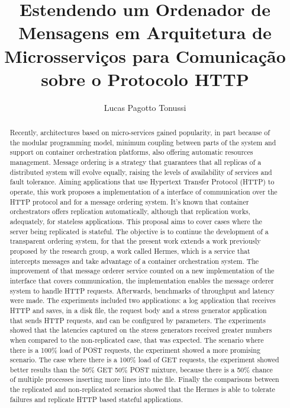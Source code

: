 \documentclass[12pt]{article}
\title{Estendendo um Ordenador de Mensagens em Arquitetura de Microsserviços para Comunicação sobre o Protocolo HTTP}
\author{Lucas Pagotto Tonussi\inst{1} }
\begin{document}
 

\maketitle

\begin{abstract}
Recently, architectures based on micro-services gained popularity, in part because of the modular programming model, minimum coupling between parts of the system and support on container orchestration platforms, also offering automatic resources management. Message ordering is a strategy that guarantees that all replicas of a distributed system will evolve equally, raising the levels of availability of services and fault tolerance. Aiming applications that use Hypertext Transfer Protocol (HTTP) to operate, this work proposes a implementation of a interface of communication over the {HTTP} protocol and for a message ordering system. It's known that container orchestrators offers replication automatically, although that replication works, adequately, for stateless applications. This proposal aims to cover cases where the server being replicated is stateful. The objective is to continue the development of a transparent ordering system, for that the present work extends a work previously proposed by the research group, a work called Hermes, which is a service that intercepts messages and take advantage of a container orchestration system. The improvement of that message orderer service counted on a new implementation of the interface that covers communication, the implementation enables the message orderer system to handle {HTTP} requests. Afterwards, benchmarks of throughput and latency were made. The experiments included two applications: a log application that receives HTTP and saves, in a disk file, the request body and a stress generator application that sends HTTP requests, and can be configured by parameters. The experiments showed that the latencies captured on the stress generators received greater numbers when compared to the non-replicated case, that was expected. The scenario where there is a 100\% load of POST requests, the experiment showed a more promising scenario. The case where there is a 100\% load of GET requests, the experiment showed better results than the 50\% GET 50\% POST mixture, because there is a 50\% chance of multiple processes inserting more lines into the file. Finally the comparisons between the replicated and non-replicated scenarios showed that the Hermes is able to tolerate failures and replicate HTTP based stateful applications.
\end{abstract}
     
\end{document}
